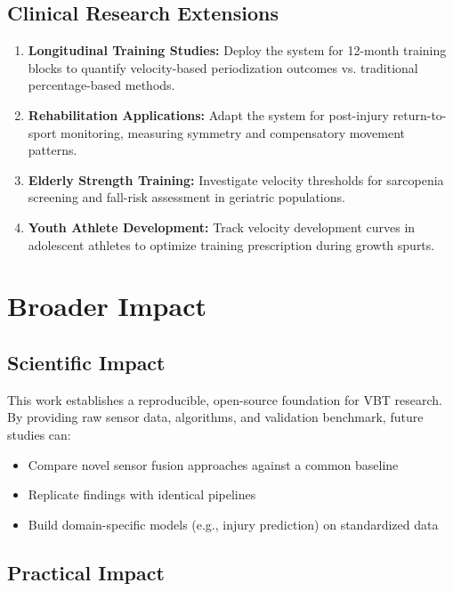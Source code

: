 \subsection{Clinical Research Extensions}

\begin{enumerate}
    \item \textbf{Longitudinal Training Studies:} Deploy the system for 12-month training blocks to quantify velocity-based periodization outcomes vs. traditional percentage-based methods.

    \item \textbf{Rehabilitation Applications:} Adapt the system for post-injury return-to-sport monitoring, measuring symmetry and compensatory movement patterns.

    \item \textbf{Elderly Strength Training:} Investigate velocity thresholds for sarcopenia screening and fall-risk assessment in geriatric populations.

    \item \textbf{Youth Athlete Development:} Track velocity development curves in adolescent athletes to optimize training prescription during growth spurts.
\end{enumerate}

\section{Broader Impact}

\subsection{Scientific Impact}

This work establishes a reproducible, open-source foundation for VBT research. By providing raw sensor data, algorithms, and validation benchmark, future studies can:
\begin{itemize}
    \item Compare novel sensor fusion approaches against a common baseline
    \item Replicate findings with identical pipelines
    \item Build domain-specific models (e.g., injury prediction) on standardized data
\end{itemize}

\subsection{Practical Impact}

